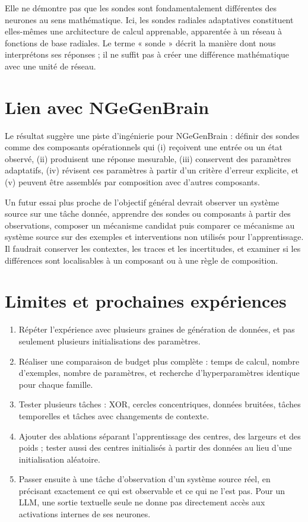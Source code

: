 \documentclass[11pt,a4paper]{article}
\begin{document}
Elle ne démontre pas que les sondes sont fondamentalement différentes des neurones au sens mathématique. Ici, les sondes radiales adaptatives constituent elles-mêmes une architecture de calcul apprenable, apparentée à un réseau à fonctions de base radiales. Le terme « sonde » décrit la manière dont nous interprétons ses réponses ; il ne suffit pas à créer une différence mathématique avec une unité de réseau.

\section{Lien avec NGeGenBrain}
Le résultat suggère une piste d'ingénierie pour NGeGenBrain : définir des sondes comme des composants opérationnels qui (i) reçoivent une entrée ou un état observé, (ii) produisent une réponse mesurable, (iii) conservent des paramètres adaptatifs, (iv) révisent ces paramètres à partir d'un critère d'erreur explicite, et (v) peuvent être assemblés par composition avec d'autres composants.

Un futur essai plus proche de l'objectif général devrait observer un système source sur une tâche donnée, apprendre des sondes ou composants à partir des observations, composer un mécanisme candidat puis comparer ce mécanisme au système source sur des exemples et interventions non utilisés pour l'apprentissage. Il faudrait conserver les contextes, les traces et les incertitudes, et examiner si les différences sont localisables à un composant ou à une règle de composition.

\section{Limites et prochaines expériences}
\begin{enumerate}[leftmargin=1.5em]
  \item Répéter l'expérience avec plusieurs graines de génération de données, et pas seulement plusieurs initialisations des paramètres.
  \item Réaliser une comparaison de budget plus complète : temps de calcul, nombre d'exemples, nombre de paramètres, et recherche d'hyperparamètres identique pour chaque famille.
  \item Tester plusieurs tâches : XOR, cercles concentriques, données bruitées, tâches temporelles et tâches avec changements de contexte.
  \item Ajouter des ablations séparant l'apprentissage des centres, des largeurs et des poids ; tester aussi des centres initialisés à partir des données au lieu d'une initialisation aléatoire.
  \item Passer ensuite à une tâche d'observation d'un système source réel, en précisant exactement ce qui est observable et ce qui ne l'est pas. Pour un LLM, une sortie textuelle seule ne donne pas directement accès aux activations internes de ses neurones.
\end{enumerate}
\end{document}
